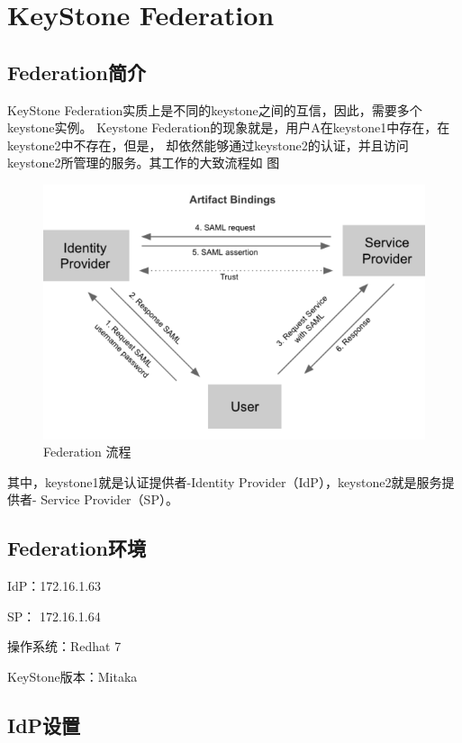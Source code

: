 \chapter{KeyStone Federation}

\section{Federation简介}
KeyStone Federation实质上是不同的keystone之间的互信，因此，需要多个keystone实例。
Keystone Federation的现象就是，用户A在keystone1中存在，在keystone2中不存在，但是，
却依然能够通过keystone2的认证，并且访问keystone2所管理的服务。其工作的大致流程如
图 

\begin{figure}[H]
  \centering
  \includegraphics[scale=0.8]{k2k_auth.png}
  \caption{Federation 流程\protect\footnotemark}
  \label{fig:k2k_auth}
\end{figure}

其中，keystone1就是认证提供者-Identity Provider（IdP），keystone2就是服务提供者-
Service Provider（SP）。

\section{Federation环境}
IdP：172.16.1.63

SP： 172.16.1.64

操作系统：Redhat 7

KeyStone版本：Mitaka

\section{IdP设置}

